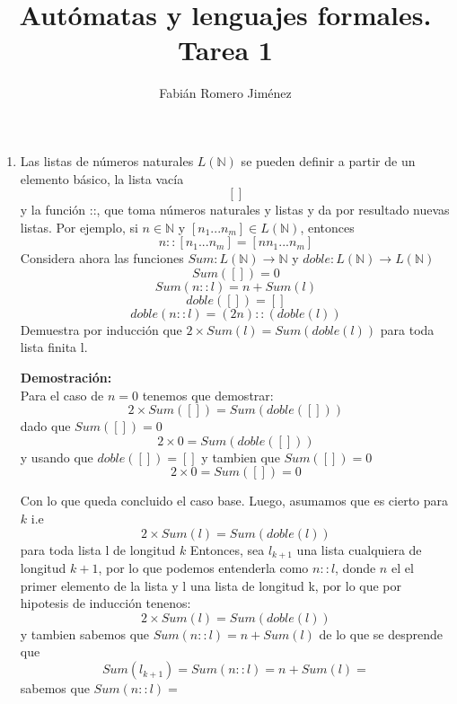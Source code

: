 \documentclass{article}
\title{Autómatas y lenguajes formales. Tarea 1}
\author{Fabián Romero Jiménez}
\begin{document}
\maketitle
\begin{enumerate}
\item Las listas de números naturales $L( \mathbb{N} )$ se pueden definir a partir de un elemento básico, la lista vacía
$$ [ ] $$
y la función ::, que toma números naturales y listas y da por resultado nuevas listas. Por ejemplo, si $ n \in \mathbb{N}$ y $[n_{1} . . . n_{m}] \in L(\mathbb{N}) $, entonces $$ n :: [n_{1} . . . n_{m}] = [n n_{1} . . . n_{m}] $$
Considera ahora las funciones $ Sum : L(\mathbb{N}) \rightarrow \mathbb{N} $ y $ doble : L(\mathbb{N}) \rightarrow L(\mathbb{N}) $
$$ Sum([ ]) = 0     $$
$$ Sum(n :: l) = n + Sum(l)   $$
$$ doble([ ]) = [ ] $$
$$ doble(n :: l) = (2  n) :: (doble(l)) $$
Demuestra por inducción que $ 2 \times Sum(l) = Sum(doble(l))$ para toda lista finita l.

\textbf{Demostración:}\\
Para el caso de $n = 0$ tenemos que demostrar:
$$  2 \times Sum([]) = Sum(doble([]))  $$
dado que $ Sum([ ]) = 0  $
$$  2 \times 0 = Sum(doble([]))  $$
y usando que $ doble([ ]) = [ ] $ y tambien que $ Sum([ ]) = 0  $
$$  2 \times 0 = Sum([])= 0 $$

Con lo que queda concluido el caso base.
Luego, asumamos que es cierto para  $k$
i.e
$$  2 \times Sum(l) = Sum(doble(l)) $$ para toda lista l de longitud $k$
Entonces, sea $l_{k+1}$ una lista cualquiera de longitud $k+1$, por lo que podemos entenderla como $n::l$, donde $n$ el el primer elemento de la lista y l una lista de longitud k, por lo que por hipotesis de inducción tenenos:
$$  2 \times Sum(l) = Sum(doble(l))  $$
y tambien sabemos que $ Sum(n::l)=n + Sum(l) $ de lo que se desprende que 
$$ Sum(l_{k+1}) = Sum(n::l)=n + Sum(l) =  $$ 
sabemos que $Sum(n::l) =$

\end{enumerate}
\end{document}
